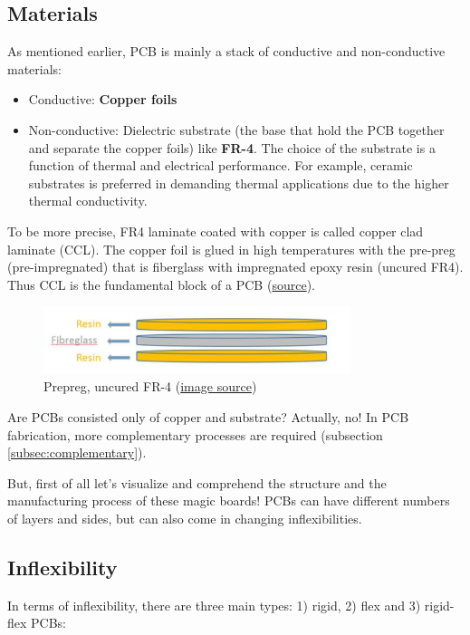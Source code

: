 \documentclass[final]{cubedoc}
\begin{document}
	\subsection{Materials}
	
	As mentioned earlier, PCB is mainly a stack of conductive and non-conductive materials:
	
	\begin{itemize}
		\item Conductive: \textbf{Copper foils}
		\item Non-conductive: Dielectric substrate (the base that hold the PCB together and separate the copper foils) like \textbf{FR-4}. The choice of the substrate is a function of thermal and electrical performance. For example, ceramic substrates is preferred in demanding thermal applications due to the higher thermal conductivity.
	\end{itemize}
	
	To be more precise, FR4 laminate coated with copper is called copper clad laminate (CCL). The copper foil is glued in high temperatures with the pre-preg (pre-impregnated) that is fiberglass with impregnated epoxy resin (uncured FR4). Thus CCL is the fundamental block of a PCB (\href{https://www.pcbway.com/blog/PCB_Basic_Information/Copper_Clad_Laminate.html}{source}).
	
	\begin{figure}[h]
		\centering
		\includegraphics[width=0.8\textwidth,height=0.8\textheight,keepaspectratio]{assets/fiberglass_resin.png}
		\caption{Prepreg, uncured FR-4 \small({\href{https://web.archive.org/web/20200814080226/https://www.pcbway.com/blog/PCB_Basic_Information/Copper_Clad_Laminate.html}{image source}})}
	\end{figure}
	
	Are PCBs consisted only of copper and substrate? Actually, no! In PCB fabrication, more complementary processes are required (subsection \ref{subsec:complementary}).
	
	But, first of all let’s visualize and comprehend the structure and the manufacturing process of these magic boards! PCBs can have different numbers of layers and sides, but can also come in changing inflexibilities. 
	
	\subsection{Inflexibility}
	In terms of inflexibility, there are three main types: 1) rigid, 2) flex and 3) rigid-flex PCBs:
	
\end{document}
